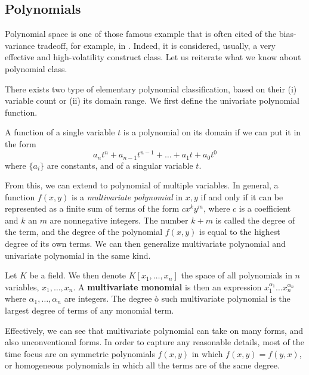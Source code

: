 \documentclass[10pt]{article} %
\begin{document}
\clearpage

\subsection{Polynomials}

Polynomial space is one of those famous example that is often cited of the bias-variance tradeoff, for example, in \cite{goodfellow2016deep,10.5555/2930837}. Indeed, it is considered, usually, a very effective and high-volatility construct class. Let us reiterate what we know about polynomial class. 

There exists two type of elementary polynomial classification, based on their (i) variable count or (ii) its domain range. We first define the univariate polynomial function.

\begin{definition}
    A function of a single variable $t$ is a polynomial on its domain if we can put it in the form 
    \begin{equation}
        a_{n}t^{n} + a_{n-1}t^{n-1} + \dots + a_{1}t + a_{0}t^{0}
    \end{equation}
    where $\{a_{i}\}$ are constants, and of a singular variable $t$.  
\end{definition}

From this, we can extend to polynomial of multiple variables. In general, a function $f(x,y)$ is a \textit{multivariate polynomial} in $x,y$ if and only if it can be represented as a finite sum of terms of the form $cx^{k}y^{m}$, where $c$ is a coefficient and $k$ an $m$ are nonnegative integers. The number $k+m$ is called the degree of the term, and the degree of the polynomial $f(x,y)$ is equal to the highest degree of its own terms. We can then generalize multivariate polynomial and univariate polynomial in the same kind. 

\begin{definition}
    Let $K$ be a field. We then denote $K[x_{1},\dots,x_{n}]$ the space of all polynomials in $n$ variables, $x_{1},\dots,x_{n}$. A \textbf{multivariate monomial} is then an expression $x_{1}^{\alpha_{1}}\dots x_{n}^{\alpha_{n}}$ where $\alpha_{1},\dots,\alpha_{n}$ are integers. The degree ò such multivariate polynomial is the largest degree of terms of any monomial term.
\end{definition}
Effectively, we can see that multivariate polynomial can take on many forms, and also unconventional forms. In order to capture any reasonable details, most of the time focus are on symmetric polynomials $f(x,y)$ in which $f(x,y)=f(y,x)$, or homogeneous polynomials in which all the terms are of the same degree. 
\end{document}
